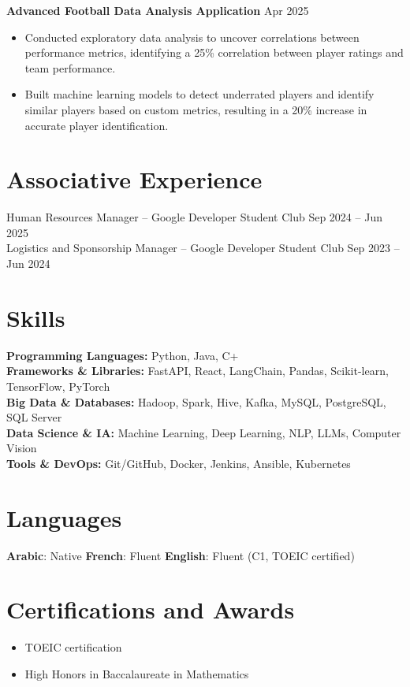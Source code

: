 \documentclass[9pt]{article}
\newcommand{\cvitem}[2]{#2}
\begin{document}
\textbf{Advanced Football Data Analysis Application} \hfill Apr 2025
\begin{itemize}[itemsep=-0.2em]
    \item Conducted exploratory data analysis to uncover correlations between performance metrics, identifying a 25\% correlation between player ratings and team performance.
    \item Built machine learning models to detect underrated players and identify similar players based on custom metrics, resulting in a 20\% increase in accurate player identification.
\end{itemize}

\section*{Associative Experience}
Human Resources Manager -- Google Developer Student Club \hfill Sep 2024 -- Jun 2025 \\
Logistics and Sponsorship Manager -- Google Developer Student Club \hfill Sep 2023 -- Jun 2024

\section*{Skills}
\cvitem{}{%
  \textbf{Programming Languages:} Python, Java, C\++ \\
  \textbf{Frameworks \& Libraries:} FastAPI, React, LangChain, Pandas, Scikit-learn, TensorFlow, PyTorch \\
  \textbf{Big Data \& Databases:} Hadoop, Spark, Hive, Kafka, MySQL, PostgreSQL, SQL Server \\
  \textbf{Data Science \& IA:} Machine Learning, Deep Learning, NLP, LLMs, Computer Vision \\
  \textbf{Tools \& DevOps:} Git/GitHub, Docker, Jenkins, Ansible, Kubernetes
}

\section*{Languages}
\begin{center}
\textbf{Arabic}: Native \hspace{1em} \textbf{French}: Fluent \hspace{1em} \textbf{English}: Fluent (C1, TOEIC certified)
\end{center}

\section*{Certifications and Awards}
\begin{itemize}[itemsep=-0.2em] 
    \item TOEIC certification
    \item High Honors in Baccalaureate in Mathematics
\end{itemize}
\end{document}
